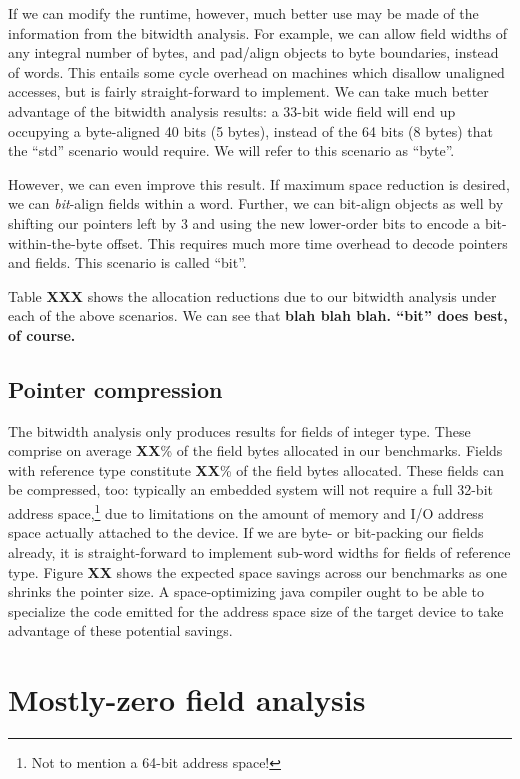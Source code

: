 \documentclass[preprint]{acmconf}
\begin{document}
If we can modify the runtime, however, much better use may be made of
the information from the bitwidth analysis.  For example, we can
allow field widths of any integral number of bytes, and pad/align
objects to byte boundaries, instead of words.  This entails some
cycle overhead on machines which disallow unaligned accesses, but is
fairly straight-forward to implement.  We can take much better
advantage of the bitwidth analysis results: a 33-bit wide field will
end up occupying a byte-aligned 40 bits (5 bytes), instead of the 64
bits (8 bytes) that the ``std'' scenario would require.  We will refer
to this scenario as ``byte''.

However, we can even improve this result.  If maximum space reduction
is desired, we can {\it bit}-align fields within a word.  Further, we
can bit-align objects as well by shifting our pointers left by 3 and
using the new lower-order bits to encode a bit-within-the-byte offset.
This requires much more time overhead to decode pointers and fields.
This scenario is called ``bit''.

Table {\bf XXX} shows the allocation reductions due to our bitwidth
analysis under each of the above scenarios.  We can see that {\bf blah
  blah blah.  ``bit'' does best, of course.}

\subsection{Pointer compression}\label{sec:ptrcmp}
The bitwidth analysis only produces results for fields of integer type.
These comprise on average {\bf XX}\% of the field bytes allocated in
our benchmarks.  Fields with reference type constitute {\bf XX}\% of
the field bytes allocated.  These fields can be compressed, too:
typically an embedded system will not require a full 32-bit address
space,\footnote{Not to mention a 64-bit address space!} due to
limitations on the amount of memory and I/O address space actually attached
to the device.  If we are byte- or bit-packing our fields already,
it is straight-forward to implement sub-word widths for fields of
reference type.  Figure {\bf XX} shows the expected space savings
across our benchmarks as one shrinks the pointer size.  A
space-optimizing java compiler ought to be able to specialize the code
emitted for the address space size of the target device to take
advantage of these potential savings.

\section{Mostly-zero field analysis}
\end{document}
